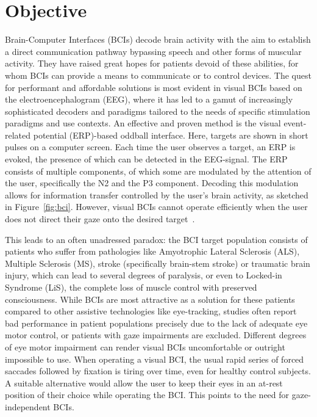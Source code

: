 

\section{Objective}

Brain-Computer Interfaces (BCIs) decode brain activity with the aim to establish a direct communication
pathway bypassing speech and other forms of muscular activity. They have raised great hopes for patients
devoid of these abilities, for whom BCIs can provide a means to communicate or to
control devices.
The quest for performant and affordable solutions is most evident in
visual BCIs based on the electroencephalogram (EEG), where it has led to a gamut of increasingly sophisticated decoders
and paradigms tailored to the needs of specific stimulation paradigms and
use contexts.
An effective and proven method is the visual event-related potential (ERP)-based
oddball interface.
Here, targets are shown in short pulses on a computer screen.
Each time the user observes a target, an ERP is evoked, the presence of which can be
detected in the EEG-signal.
The ERP consists of multiple components, of which some are modulated by the
attention of the user, specifically the N2 and the P3 component.
Decoding this modulation allows for information transfer controlled by the
user's brain activity, as sketched in Figure~\ref{fig:bci}.
However, visual BCIs cannot operate efficiently when the user does not direct
their gaze onto the desired target~\cite{Brunner2010, Frenzel2011}.

This leads to an often unadressed paradox: the BCI target population consists
of patients who suffer from pathologies like Amyotrophic Lateral Sclerosis
(ALS), Multiple Sclerosis (MS), stroke (specifically
brain-stem stroke) or traumatic brain injury, which can lead to several degrees
of paralysis, or even to Locked-in Syndrome (LiS), the complete loss of muscle
control with preserved consciousness.
While BCIs are most attractive as a solution for these patients
compared to other assistive technologies like eye-tracking, studies often
report bad performance in patient populations precisely due to the lack of adequate eye motor
control, or patients with gaze impairments are excluded.
Different degrees of eye motor impairment can render visual BCIs
uncomfortable or outright impossible to use.
When operating a visual BCI, the usual rapid series of forced saccades followed
by fixation is tiring over time, even for healthy control subjects.
A suitable alternative would allow the user to keep their eyes in an at-rest
position of their choice while operating the BCI.
This points to the need for gaze-independent BCIs.

